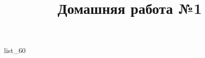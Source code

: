 \documentclass[12pt, a4paper]{article}
\begin{document}
	\title{Домашняя работа №1}
	{list_60}
\end{document}
